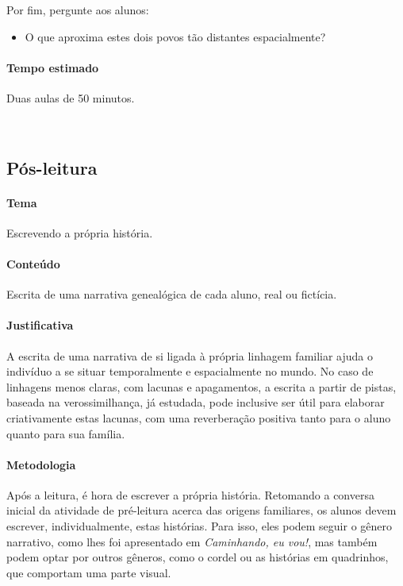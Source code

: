 \documentclass[11pt]{extarticle}
\begin{document}
Por fim, pergunte aos alunos: 

\begin{itemize}
\item O que aproxima estes dois povos tão distantes espacialmente? 
\end{itemize}


\paragraph{Tempo estimado} Duas aulas de 50 minutos.  

 
\subsection{Pós-leitura}


\paragraph{Tema} Escrevendo a própria história.

\paragraph{Conteúdo} Escrita de uma narrativa genealógica de cada aluno,
real ou fictícia.

\paragraph{Justificativa} A escrita de uma narrativa de si ligada à própria 
linhagem familiar ajuda o indivíduo a se situar temporalmente e espacialmente
no mundo. No caso de linhagens menos claras, com lacunas e apagamentos,
a escrita a partir de pistas, baseada na verossimilhança, já estudada,
pode inclusive ser útil para elaborar criativamente estas lacunas,
com uma reverberação positiva tanto para o aluno quanto para sua família. 

\paragraph{Metodologia} 
Após a leitura, é hora de escrever a própria história.
Retomando a conversa inicial da atividade de pré-leitura
acerca das origens familiares, os alunos devem escrever, 
individualmente, estas histórias. Para isso, eles podem
seguir o gênero narrativo, como lhes foi apresentado em
\textit{Caminhando, eu vou!}, mas também podem optar
por outros gêneros, como o cordel ou as histórias em 
quadrinhos, que comportam uma parte visual. 
\end{document}
